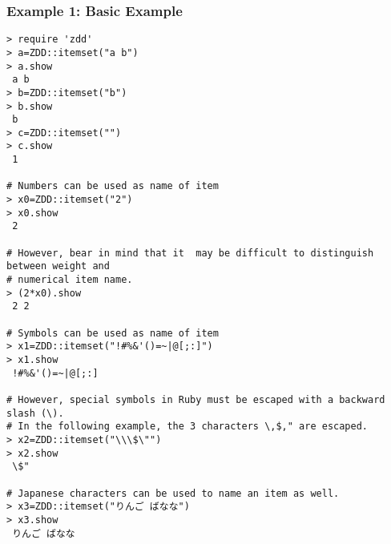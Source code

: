 \subsubsection*{Example 1: Basic Example}



\begin{Verbatim}[baselinestretch=0.7,frame=single]
> require 'zdd'
> a=ZDD::itemset("a b")
> a.show
 a b
> b=ZDD::itemset("b")
> b.show
 b
> c=ZDD::itemset("")
> c.show
 1

# Numbers can be used as name of item
> x0=ZDD::itemset("2")
> x0.show
 2

# However, bear in mind that it  may be difficult to distinguish between weight and
# numerical item name.
> (2*x0).show
 2 2

# Symbols can be used as name of item 
> x1=ZDD::itemset("!#%&'()=~|@[;:]")
> x1.show
 !#%&'()=~|@[;:]

# However, special symbols in Ruby must be escaped with a backward slash (\).
# In the following example, the 3 characters \,$," are escaped. 
> x2=ZDD::itemset("\\\$\"")
> x2.show
 \$"

# Japanese characters can be used to name an item as well. 
> x3=ZDD::itemset("りんご ばなな")
> x3.show
 りんご ばなな
\end{Verbatim}
